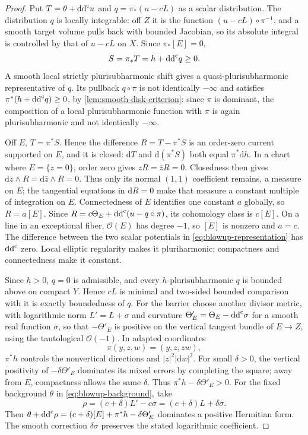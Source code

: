 \begin{proof}
Put $T=\theta+\mathrm{dd}^{\mathrm{c}} u$ and $q=\pi_*(u-cL)$ as a scalar distribution. The distribution $q$ is locally integrable: off $Z$ it is the function $(u-cL)\circ\pi^{-1}$, and a smooth target volume pulls back with bounded Jacobian, so its absolute integral is controlled by that of $u-cL$ on $X$. Since $\pi_*[E]=0$,
\[
 S=\pi_*T=h+\mathrm{dd}^{\mathrm{c}} q\geq0.
\]
A smooth local strictly plurisubharmonic shift gives a quasi-plurisubharmonic representative of $q$. Its pullback $q\circ\pi$ is not identically $-\infty$ and satisfies $\pi^*(h+\mathrm{dd}^{\mathrm{c}} q)\geq0$, by \cref{lem:smooth-disk-criterion}: since $\pi$ is dominant, the composition of a local plurisubharmonic function with $\pi$ is again plurisubharmonic and not identically $-\infty$.

Off $E$, $T=\pi^*S$. Hence the difference $R=T-\pi^*S$ is an order-zero current supported on $E$, and it is closed: $\mathrm{d}T$ and $\mathrm{d}(\pi^*S)$ both equal $\pi^*\mathrm{d} h$. In a chart where $E=\{z=0\}$, order zero gives $zR=\bar zR=0$. Closedness then gives $\mathrm{d}z\wedge R=\mathrm{d}\bar z\wedge R=0$. Thus only its normal $(1,1)$ coefficient remains, a measure on $E$; the tangential equations in $\mathrm{d}R=0$ make that measure a constant multiple of integration on $E$. Connectedness of $E$ identifies one constant $a$ globally, so $R=a[E]$. Since $R=c\Theta_E+\mathrm{dd}^{\mathrm{c}}(u-q\circ\pi)$, its cohomology class is $c[E]$. On a line in an exceptional fiber, $\mathcal O(E)$ has degree $-1$, so $[E]$ is nonzero and $a=c$. The difference between the two scalar potentials in \eqref{eq:blowup-representation} has $\mathrm{dd}^{\mathrm{c}}$ zero. Local elliptic regularity makes it pluriharmonic; compactness and connectedness make it constant.

Since $h>0$, $q=0$ is admissible, and every $h$-plurisubharmonic $q$ is bounded above on compact $Y$. Hence $cL$ is minimal and two-sided bounded comparison with it is exactly boundedness of $q$. For the barrier choose another divisor metric, with logarithmic norm $L'=L+\sigma$ and curvature $\Theta'_E=\Theta_E-\mathrm{dd}^{\mathrm{c}}\sigma$ for a smooth real function $\sigma$, so that $-\Theta'_E$ is positive on the vertical tangent bundle of $E\to Z$, using the tautological $\mathcal O(-1)$. In adapted coordinates
\begin{equation}\label{eq:blowup-chart}
 \pi(y,z,w)=(y,z,zw),
\end{equation}
$\pi^*h$ controls the nonvertical directions and $|z|^2|\mathrm{d} w|^2$. For small $\delta>0$, the vertical positivity of $-\delta\Theta'_E$ dominates its mixed errors by completing the square; away from $E$, compactness allows the same $\delta$. Thus $\pi^*h-\delta\Theta'_E>0$. For the fixed background $\theta$ in \eqref{eq:blowup-background}, take
\[
 \rho=(c+\delta)L'-c\sigma=(c+\delta)L+\delta\sigma.
\]
Then $\theta+\mathrm{dd}^{\mathrm{c}}\rho=(c+\delta)[E]+\pi^*h-\delta\Theta'_E$ dominates a positive Hermitian form. The smooth correction $\delta\sigma$ preserves the stated logarithmic coefficient.
\end{proof}

